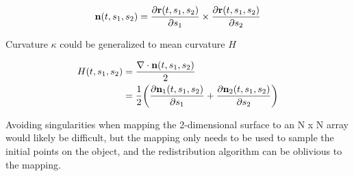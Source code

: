 \[
  \mathbf{n}(t, s_1, s_2) = \frac{\partial \mathbf{r}(t, s_1, s_2)}{\partial s_1} \times \frac{\partial \mathbf{r}(t, s_1, s_2)}{\partial s_2} 
\]

Curvature $\kappa$ could be generalized to mean curvature $H$

\begin{align*}
  H(t, s_1, s_2)& = \frac{\nabla \cdot \bvec{n}(t, s_1, s_2)}{2}\\
  &= \frac{1}{2} \paren{\frac{\partial \bvec{n}_1(t, s_1, s_2)}{\partial s_1} + \frac{\partial \bvec{n}_2(t, s_1, s_2)}{\partial s_2}}
\end{align*}

Avoiding singularities when mapping the 2-dimensional surface to an N x N array would likely be difficult, but the mapping only needs to be used to sample the initial points on the object, and the redistribution algorithm can be oblivious to the mapping.

